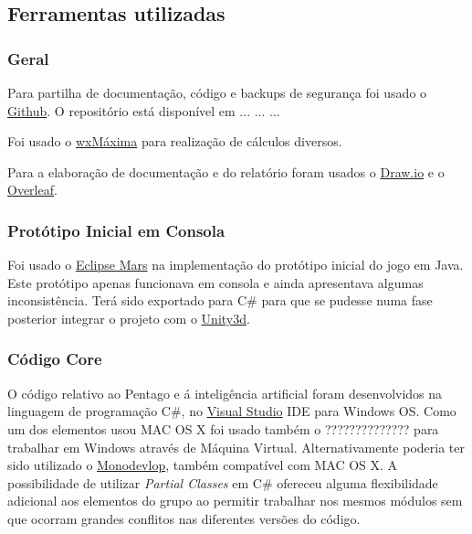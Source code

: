 
\subsection{Ferramentas utilizadas}

\subsubsection{Geral}

Para partilha de documentação, código e backups de segurança foi usado o \href{https://github.com/}{Github}.
O repositório está disponível em ... ... ...

Foi usado o \href{http://andrejv.github.io/wxmaxima/}{wxMáxima} para realização de cálculos diversos.

Para a elaboração de documentação e do relatório foram usados o \href{https://www.draw.io/}{Draw.io} e o \href{https://www.overleaf.com}{Overleaf}.

\subsubsection{Protótipo Inicial em Consola}

Foi usado o \href{https://eclipse.org/mars/}{Eclipse Mars} na implementação do protótipo inicial do jogo em Java. Este protótipo apenas funcionava em consola e ainda apresentava algumas inconsistência. Terá sido exportado para C\# para que se pudesse numa fase posterior integrar o projeto com o \href{https://unity3d.com/pt}{Unity3d}. 

\subsubsection{Código Core}

O código relativo ao Pentago e á inteligência artificial foram desenvolvidos na linguagem de programação C\#, no \href{https://www.visualstudio.com/}{Visual Studio} IDE para Windows OS. Como um dos elementos usou MAC OS X foi usado também o ?????????????? para trabalhar em Windows através de Máquina Virtual. Alternativamente poderia ter sido utilizado o \href{http://www.monodevelop.com/}{Monodevlop}, também compatível com MAC OS X.
A possibilidade de utilizar \emph{Partial Classes} em C\# ofereceu alguma flexibilidade adicional aos elementos do grupo ao permitir trabalhar nos mesmos módulos sem que ocorram grandes conflitos nas diferentes versões do código.

